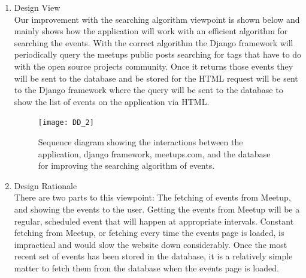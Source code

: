\documentclass[draftclsnofoot,10pt,onecolumn]{IEEEtran} %
\begin{document}
\begin{enumerate}
\begin{enumerate}
\begin{enumerate}
				\item Design View \\ %
				Our improvement with the searching algorithm viewpoint is shown below and mainly shows how the
			    application will work with an efficient algorithm for searching the events. With the correct algorithm the
				Django framework will periodically query the meetups public posts searching for tags that have to do with
				the open source projects community. Once it returns those events they will be sent to the database and be
				stored for the HTML request will be sent to the
				Django framework where the query will be sent to the database to show the list of events on the application
				via HTML.\\
				
				\begin{figure}[H]
  					\begin{center}
						\texttt{[image: DD\_2]}
						\captionsetup{width=.4\linewidth}
						\centering
  						\caption{Sequence diagram showing the interactions between the application, django framework, 
  						meetups.com, and the database for improving the searching algorithm of events.}
  					\end{center}
				\end{figure}
						
				\item Design Rationale \\
				There are two parts to this viewpoint: The fetching of events from Meetup, and showing the events to the
				user. Getting the events from Meetup will be a regular, scheduled event that will happen at appropriate
				intervals. Constant fetching from Meetup, or fetching every time the events page is loaded, is impractical
				and would slow the website down considerably. Once the most recent set of events has been stored in the
				database, it is a relatively simple matter to fetch them from the database when the events page is loaded. \\
				
			\end{enumerate}
			

\end{enumerate}
\end{enumerate}
\end{document}
